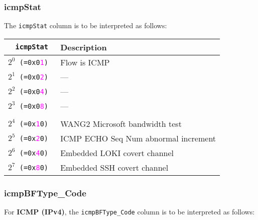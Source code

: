 \documentclass[documentation]{subfiles}
\begin{document}
\subsubsection{icmpStat}\label{icmpStat}
The {\tt icmpStat} column is to be interpreted as follows:
\begin{longtable}{>{\tt}rl}
    \toprule
    {\bf icmpStat}                     & {\bf Description}\\
    \midrule\endhead%
    $2^0$ (=0x0\textcolor{magenta}{1}) & Flow is ICMP\\
    $2^1$ (=0x0\textcolor{magenta}{2}) & ---\\
    $2^2$ (=0x0\textcolor{magenta}{4}) & ---\\
    $2^3$ (=0x0\textcolor{magenta}{8}) & ---\\
    \\
    $2^4$ (=0x\textcolor{magenta}{1}0) & WANG2 Microsoft bandwidth test\\
    $2^5$ (=0x\textcolor{magenta}{2}0) & ICMP ECHO Seq Num abnormal increment\\
    $2^6$ (=0x\textcolor{magenta}{4}0) & Embedded LOKI covert channel\\
    $2^7$ (=0x\textcolor{magenta}{8}0) & Embedded SSH covert channel\\
    \bottomrule
\end{longtable}

\subsubsection{icmpBFType\_Code}\label{icmpBFTypeCode}

For {\bf ICMP (IPv4)}, the {\tt icmpBFType\_Code} column is to be interpreted as follows:
\end{document}
